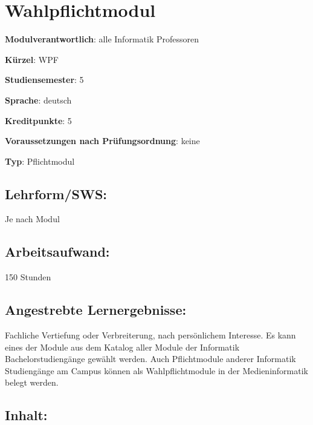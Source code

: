 \chapter{Wahlpflichtmodul}\label{wahlpflichtmodul}

\begin{modulHead}
\textbf{Modulverantwortlich}: alle Informatik
Professoren
\end{modulHead}
\begin{modulHead}
\textbf{Kürzel}:
WPF
\end{modulHead}
\begin{modulHead}
\textbf{Studiensemester}:
5
\end{modulHead}
\begin{modulHead}
\textbf{Sprache}:
deutsch
\end{modulHead}
\begin{modulHead}
\textbf{Kreditpunkte}:
5
\end{modulHead}
\begin{modulHead}
\textbf{Voraussetzungen nach
Prüfungsordnung}: keine
\end{modulHead}
\begin{modulHead}
\textbf{Typ}:
Pflichtmodul
\end{modulHead}


\section*{Lehrform/SWS:}\label{lehrformsws-28}

Je nach Modul

\section*{Arbeitsaufwand:}\label{arbeitsaufwand-27}

150 Stunden

\section*{Angestrebte
Lernergebnisse:}\label{angestrebte-lernergebnisse-28}

Fachliche Vertiefung oder Verbreiterung, nach persönlichem Interesse. Es
kann eines der Module aus dem Katalog aller Module der Informatik
Bachelorstudiengänge gewählt werden. Auch Pflichtmodule anderer
Informatik Studiengänge am Campus können als Wahlpflichtmodule in der
Medieninformatik belegt werden.

\section*{Inhalt:}\label{inhalt-28}

